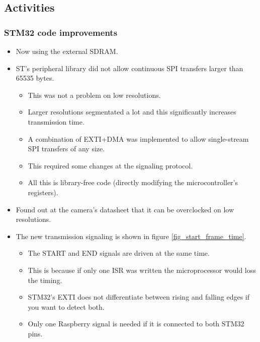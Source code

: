 \subsection{Activities}

\subsubsection{STM32 code improvements}
\begin{itemize}
	\item Now using the external SDRAM.
	\item ST's peripheral library did not allow continuous SPI transfers larger than 65535 bytes.
	\begin{itemize}
		\item This was not a problem on low resolutions.
		\item Larger resolutions segmentated a lot and this significantly increases transmission time.
		\item A combination of EXTI+DMA was implemented to allow single-stream SPI transfers of any size.
		\item This required some changes at the signaling protocol.
		\item All this is library-free code (directly modifying the microcontroller's registers).
	\end{itemize}
	\item Found out at the camera's datasheet that it can be overclocked on low resolutions.
	\item The new transmission signaling is shown in figure \ref{fig_start_frame_time}.
	\begin{itemize}
		\item The START and END signals are driven at the same time.
		\item This is because if only one ISR was written the microprocessor would loss the timing.
		\item STM32's EXTI does not differentiate between rising and falling edges if you want to detect both.
		\item Only one Raspberry signal is needed if it is connected to both STM32 pins.
	\end{itemize}
\end{itemize}



